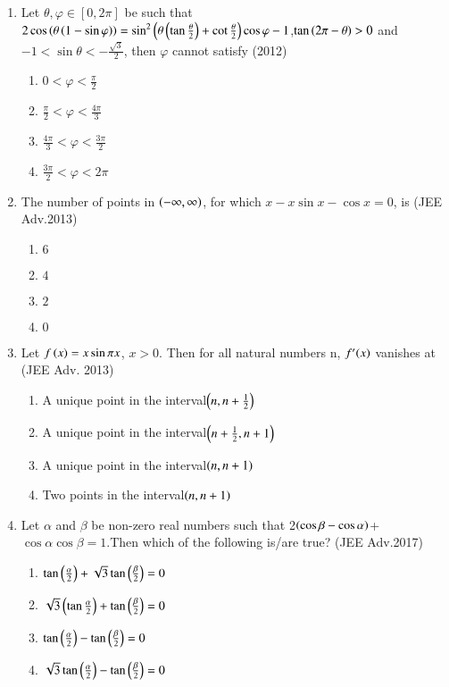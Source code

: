 \documentclass[journal,12pt,twocolumn]{IEEEtran}
\theoremstyle{remark}
\begin{document}
\begin{enumerate}
\item Let $\theta, \varphi \in [0,2\pi]$ be such that $2 \cos\left(\theta\left(1-\sin \varphi\right)\right)= 
\sin^2\left(\theta\left(\tan\frac{\theta}{2}\right)+\cot\frac{\theta}{2}\right)\cos \varphi-1$,$\tan\left(2\pi-\theta\right)>0$ and $-1<\sin{\theta}<-\frac{\sqrt{3}}{2}$, then $\varphi$ cannot satisfy \hfill(2012)
\begin{enumerate}
    \item $0<\varphi<\frac{\pi}{2}$
    \item $\frac{\pi}{2}<\varphi<\frac{4\pi}{3}$
    \item $\frac{4\pi}{3}<\varphi<\frac{3\pi}{2}$
    \item $\frac{3\pi}{2}<\varphi<2\pi$
\end{enumerate}
\item The number of points in $\left(-\infty, \infty\right)$, for which $x - x \sin x - \cos x = 0$, is \hfill(JEE Adv.2013)
\begin{enumerate}
    \item $6$
    \item $4$
    \item $2$
    \item $0$
\end{enumerate}
\item Let $f\left(x\right)=x\sin\pi x $, $ x>0 $. Then for all  natural numbers n, \( f'{\left(x\right)} \) vanishes at 
\hfill(JEE Adv. 2013)
\begin{enumerate}
    \item A unique point in the interval$\left(n,n+\frac{1}{2}\right)$
    \item A unique point in the interval$\left(n+\frac{1}{2},n+1\right)$
    \item A unique point in the interval$\left(n,n+1\right)$
    \item Two points in the interval$\left(n,n+1\right)$
\end{enumerate}
\item Let $\alpha$ and $\beta$ be non-zero real numbers such that 2$\left(\cos \beta - \cos \alpha\right)$+$\cos \alpha \cos \beta=1$.Then which of the following is/are true? \hfill(JEE Adv.2017)
\begin{enumerate}
    \item $\tan{\ensuremath{\left(\frac{\alpha}{2}\right)}+\sqrt{3}\tan\ensuremath{\left(\frac{\beta}{2}\right)}}=0$
    \item $\sqrt{3}\left(\tan{\frac{\alpha}{2}}\right)+\tan\left({\frac{\beta}{2}}\right)=0$
    \item $\tan{\ensuremath{\left(\frac{\alpha}{2}\right)}}-\tan{\ensuremath{\left(\frac{\beta}{2}\right)}}=0$
    \item $\sqrt{3}\tan{\ensuremath{\left(\frac{\alpha}{2}\right)}}-\tan{\ensuremath{\left(\frac{\beta}{2}\right)}}=0$
\end{enumerate}
\end{enumerate}
\end{document}

